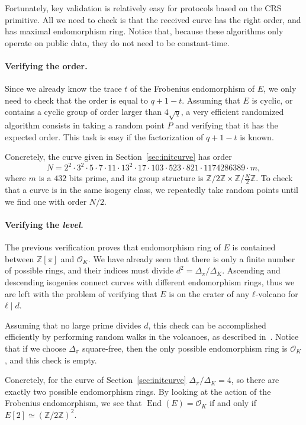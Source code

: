 \documentclass{article}
\renewcommand{\O}{\mathcal{O}}
\theoremstyle{definition}
\DeclareMathOperator{\End}{End}
\begin{document}
Fortunately, key validation is relatively easy for protocols based on
the CRS primitive. All we need to check is that the received curve has
the right order, and has maximal endomorphism ring. Notice that,
because these algorithms only operate on public data, they do not need
to be constant-time.

\paragraph{Verifying the order.} Since we already know the trace $t$
of the Frobenius endomorphism of $E$, we only need to check that the
order is equal to $q+1-t$. Assuming that $E$ is cyclic, or contains a
cyclic group of order larger than $4\sqrt{q}$, a very efficient
randomized algorithm consists in taking a random point $P$ and
verifying that it has the expected order.  This task is easy if the
factorization of $q+1-t$ is known.

Concretely, the curve given in Section~\ref{sec:initcurve} has order
\[N = 2^2 · 3^2 · 5 · 7 · 11 · 13^2 · 17 · 103 · 523 · 821 ·
  1174286389 · m,\] %
where $m$ is a $432$ bits prime, and its group structure is
$ℤ/2ℤ×ℤ/\frac{N}{2}ℤ$. To check that a curve is in the same isogeny
class, we repeatedly take random points until we find one with order
$N/2$.

\paragraph{Verifying the \emph{level}.} The previous verification
proves that endomorphism ring of $E$ is contained between $ℤ[π]$ and
$\O_K$. We have already seen that there is only a finite number of
possible rings, and their indices must divide $d^2=Δ_π/Δ_K$. Ascending
and descending isogenies connect curves with different endomorphism
rings, thus we are left with the problem of verifying that $E$ is on
the crater of any $ℓ$-volcano for $ℓ\mid d$.

Assuming that no large prime divides $d$, this check can be
accomplished efficiently by performing random walks in the volcanoes,
as described in~\cite{fouquet+morain02}. Notice that if we choose
$Δ_π$ square-free, then the only possible endomorphism ring is $\O_K$,
and this check is empty.

Concretely, for the curve of Section~\ref{sec:initcurve} $Δ_π/Δ_K=4$,
so there are exactly two possible endomorphism rings. By looking at
the action of the Frobenius endomorphism, we see that $\End(E)=\O_K$
if and only if $E[2]≃(ℤ/2ℤ)^2$.
\end{document}
